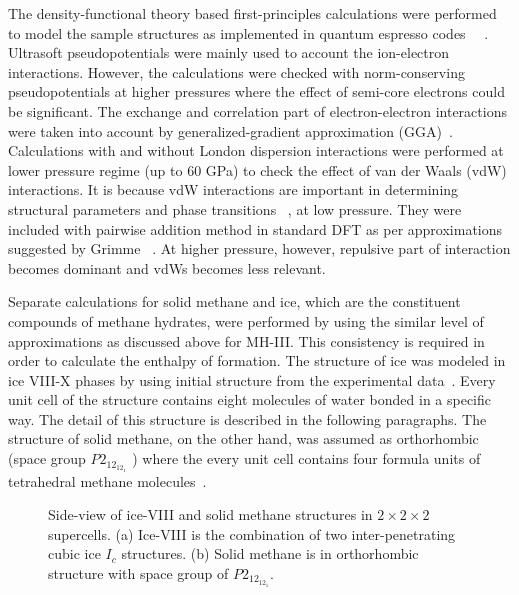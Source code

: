 The density-functional theory based first-principles calculations were performed to model the sample structures 
as implemented in quantum espresso codes \ ~\citep{Giannozzi2009, Scandolo2005}. Ultrasoft pseudopotentials were mainly used to account the ion-electron interactions. However, the calculations were checked with norm-conserving pseudopotentials at higher pressures where the effect of semi-core electrons could be significant. The exchange and correlation part of electron-electron interactions were taken into account by generalized-gradient approximation (GGA)~\citep{Perdew1996}. Calculations with and without London dispersion interactions were performed at lower pressure regime (up to 60 GPa) to check the effect of van der Waals (vdW) interactions. It is because vdW interactions are important in determining structural parameters and phase transitions ~\citep{Santra2011}, at low pressure. They were included with pairwise addition method in standard DFT as per approximations suggested by Grimme ~\citep{Grimme2004}. At higher pressure, however, repulsive part of interaction becomes dominant and vdWs becomes less relevant.
  
Separate calculations for solid methane and ice, which are the constituent compounds of methane hydrates, were performed by using the similar level of approximations as discussed above for MH-III. This consistency is required in order to calculate the enthalpy of formation. The structure of ice was modeled in ice VIII-X phases by using initial structure from the experimental data~\citep{Yamawaki2004}. Every unit cell of the structure contains eight molecules of water bonded in a specific way. The detail of this structure is described in the following paragraphs. The structure of solid methane, on the other hand, was assumed as orthorhombic (space group $P2_12_12_1$ ) where the every unit cell contains four formula units of tetrahedral methane molecules~\citep{Gao2010, Pantha2014-bibe}.
 
\begin{figure}[h!]
\begin{center} 
\end{center}
\caption[Side-view of ice-VIII and solid methane structures in $2\times 2 \times 2$ supercells.]{ Side-view of ice-VIII and solid methane 
structures in $2\times 2 \times 2$ supercells. (a) Ice-VIII is the combination of two inter-penetrating
cubic ice $I_c$ structures. (b) Solid methane is in orthorhombic structure with space group of $P2_12_12_1$. }
\label{Structures-ice-methane}
\end{figure}


